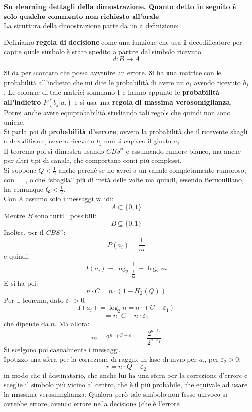 \documentclass[a4paper,12pt, oneside]{book}
\begin{document}
\textbf{Su elearning dettagli della dimostrazione. Quanto detto in seguito è
  solo qualche commento non richiesto all'orale}.\\
La struttura della dimostrazione parte da un a definizione:
\begin{definizione}
  Definiamo \textbf{regola di decisione} come una funzione che usa il
  decodificatore per capire quale simbolo è stato spedito a partire dal simbolo
  ricevuto:
  \[d:B\to A\]
\end{definizione}
Si da per scontato che possa avvenire un errore. Si ha una matrice con le
probabilità all'indietro che mi dice le probabilità di avere un $a_i$ avendo
ricevuto $b_j$. Le colonne di tale matrici sommano 1 e hanno appunto le
\textbf{probabilità all'indietro} $P(b_j|a_i)$ e si usa una \textbf{regola di
  massima verosomiglianza}. Potrei anche avere equiprobabilità studiando tali
regole che quindi non sono uniche. \\
Si parla poi di \textbf{probabilità d'errore}, ovvero la probabilità che il
ricevente sbagli a decodificare, ovvero ricevuto $b_j$ non si capisca il giusto
$a_i$. \\
Il teorema poi si dimostra usando $CBS^n$ e assumendo rumore bianco, ma anche
per altri tipi di canale, che comportano conti più complessi.\\
Si suppone $Q<\frac{1}{2}$ anche perché se no avrei o un canale completamente
rumoroso, con $=$, o che ``sbaglia'' più di metà delle volte ma quindi, essendo
Bernoulliano, ha comunque $Q<\frac{1}{2}$.\\
Con $A$ assumo solo i messaggi validi:
\[A\subset\{0,1\}\]
Mentre $B$ sono tutti i possibili:
\[B\subseteq\{0,1\}\]
Inoltre, per il $CBS^n$:
\[P(a_i)=\frac{1}{m}\]
e quindi:
\[I(a_i)=\log_2\frac{1}{\frac{1}{m}}=\log_2 m\]
E si ha poi:
\[n\cdot C=n\cdot (1-H_2(Q))\]
Per il teorema, dato $\varepsilon_1>0$:
\[I(a_i)=\log_2 n=n\cdot (C-\varepsilon_1)\]
\[=n\cdot C-n\cdot \varepsilon_1\]
che dipende da $n$. Ma allora:
\[m=2^{n\cdot(C-\varepsilon_1)}=\frac{2^{n\cdot C}}{2^{n\cdot\varepsilon_1}}\]
Si scelgono poi casualmente i messaggi.\\
Ipotizzo una sfera per la correzione di raggio, in fase di invio per $a_i$,
per $\varepsilon_2>0$: 
\[r=n\cdot Q+\varepsilon_2\]
in modo che il destinatario, che anche lui ha una sfera per la correzione
d'errore e sceglie il simbolo più vicino al centro, che è il più probabile, che
equivale ad usare la massima verosimiglianza. Qualora però tale simbolo non
fosse univoco si avrebbe errore, avendo errore nella decisione (che è l'errore
\end{document}
